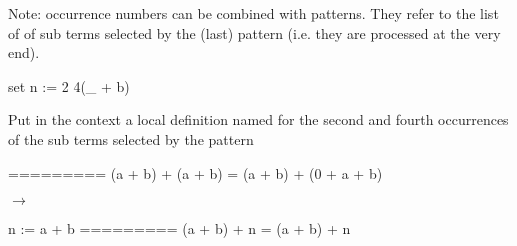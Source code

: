 \begin{landscape}
\begin{small}
\begin{multicols*}{3}[\begin{center}\section*{}\end{center}]
Note: occurrence numbers can be combined with patterns. They refer
to the list of of sub terms selected by the (last) pattern (i.e. they
are processed at the very end).

\begin{cheat}
set n := {2 4}(_ + b)
\end{cheat}
  Put in the context a local definition named  for the
  second and fourth occurrences of the sub terms selected by the
  pattern 

\begin{cheatout}
=========
(a + b) + (a + b) =
 (a + b) + (0 + a + b)
\end{cheatout}
$\to$
\begin{cheatout}
 n := a + b
=========
(a + b) + n =
  (a + b) + n
\end{cheatout}


\end{multicols*}

\end{small}
\end{landscape}
\restoregeometry
